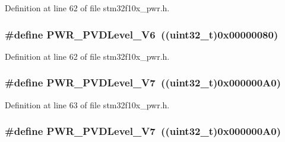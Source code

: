 Definition at line 62 of file stm32f10x\+\_\+pwr.\+h.

\subsubsection[{\texorpdfstring{P\+W\+R\+\_\+\+P\+V\+D\+Level\+\_\+2\+V6}{PWR_PVDLevel_2V6}}]{\setlength{\rightskip}{0pt plus 5cm}\#define P\+W\+R\+\_\+\+P\+V\+D\+Level\+\_\+V6~(({\bf uint32\+\_\+t})0x00000080)}\hypertarget{group___p_v_d__detection__level_ga46174e5288082b59473068a3ca8e8ea6}{}\label{group___p_v_d__detection__level_ga46174e5288082b59473068a3ca8e8ea6}


Definition at line 62 of file stm32f10x\+\_\+pwr.\+h.

\subsubsection[{\texorpdfstring{P\+W\+R\+\_\+\+P\+V\+D\+Level\+\_\+2\+V7}{PWR_PVDLevel_2V7}}]{\setlength{\rightskip}{0pt plus 5cm}\#define P\+W\+R\+\_\+\+P\+V\+D\+Level\+\_\+V7~(({\bf uint32\+\_\+t})0x000000\+A0)}\hypertarget{group___p_v_d__detection__level_ga72d22a858d8289ef02fff45f4810b916}{}\label{group___p_v_d__detection__level_ga72d22a858d8289ef02fff45f4810b916}


Definition at line 63 of file stm32f10x\+\_\+pwr.\+h.

\subsubsection[{\texorpdfstring{P\+W\+R\+\_\+\+P\+V\+D\+Level\+\_\+2\+V7}{PWR_PVDLevel_2V7}}]{\setlength{\rightskip}{0pt plus 5cm}\#define P\+W\+R\+\_\+\+P\+V\+D\+Level\+\_\+V7~(({\bf uint32\+\_\+t})0x000000\+A0)}\hypertarget{group___p_v_d__detection__level_ga72d22a858d8289ef02fff45f4810b916}{}\label{group___p_v_d__detection__level_ga72d22a858d8289ef02fff45f4810b916}



